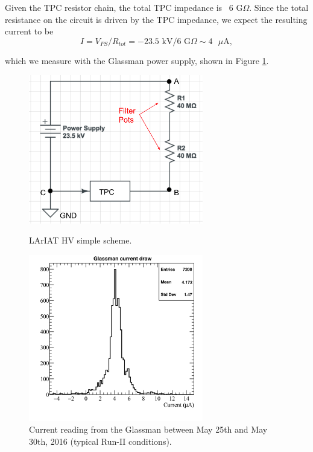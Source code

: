 Given the TPC resistor chain, the total TPC impedance is ~6 G$\Omega$. Since the total resistance on the circuit is driven by the TPC impedance, we expect the resulting current to be 
\begin{equation}
I=V_{PS} /R_{tot} = -23.5\text{ kV}/6 \text{ G}\Omega  \sim 4 \text{ $\mu$A}, 
\end{equation}

which we measure with the Glassman power supply, shown in  Figure \ref{fig:currentMeasurement}.  

\begin{figure}[h]
\centering
\begin{minipage}{0.45\textwidth}
\centering
\includegraphics[width=3in]{AppendixB-EField/Images/CircuitLArIAT.png}
\caption{LArIAT HV simple scheme.}
\label{fig:circuit}
\end{minipage}\hfill
\begin{minipage}{0.45\textwidth}
\centering
\includegraphics[width=3in]{AppendixB-EField/Images/glassman_current_20160525-30.png}
\caption{Current reading from the Glassman between May 25th and May 30th, 2016 (typical Run-II conditions).}
\label{fig:currentMeasurement}
\end{minipage}
\end{figure}

